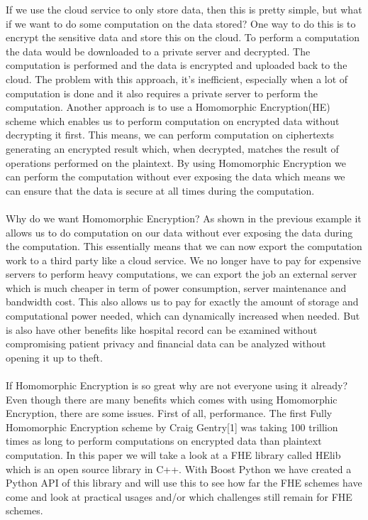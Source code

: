 \begin{enumerate}
 If we use the cloud service to only store data, then this is pretty simple, but what if we want to do some computation on the data stored? One way to do this is to encrypt the sensitive data and store this on the cloud. To perform a computation the data would be downloaded to a private server and decrypted. The computation is performed and the data is encrypted and uploaded back to the cloud. The problem with this approach, it's  inefficient, especially when a lot of computation is done and it also requires a private server to perform the computation. Another approach is to use a Homomorphic Encryption(HE) scheme which enables us to perform computation on encrypted data without decrypting it first. This means, we can perform computation on ciphertexts generating an encrypted result which, when decrypted, matches the result of operations performed on the plaintext. By using Homomorphic Encryption we can perform the computation without ever exposing the data which means we can ensure that the data is secure at all times during the computation.
\\\\
Why do we want Homomorphic Encryption? As shown in the previous example it allows us to do computation on our data without ever exposing the data during the computation. This essentially means that we can now export the computation work to a third party like a cloud service. We no longer have to pay for expensive servers to perform heavy computations, we can export the job an external server which is much cheaper in term of power consumption, server maintenance and bandwidth cost. This also allows us to pay for exactly the amount of storage and computational power needed, which can dynamically increased when needed. But is also have other benefits like hospital record can be examined without compromising patient privacy and financial data can be analyzed without opening it up to theft.
\\\\
If Homomorphic Encryption is so great why are not everyone using it already? Even though there are many benefits which comes with using Homomorphic Encryption, there are some issues.
First of all, performance. The first Fully Homomorphic Encryption scheme by Craig Gentry[1] was taking 100 trillion times as long to perform computations on encrypted data than plaintext computation. In this paper we will take a look at a FHE library called HElib which is an open source library in C++. With Boost Python we have created a Python API of this library and will use this to see how far the FHE schemes have come and look at practical usages and/or which challenges still remain for FHE schemes.  

\end{enumerate}

